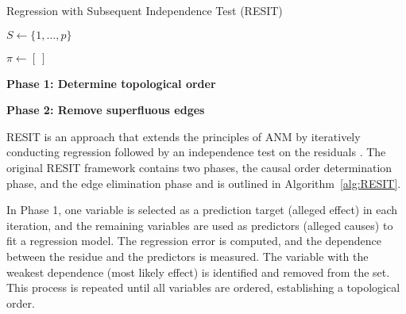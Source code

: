 \begin{algorithm}[htb]
    \caption{Regression with Subsequent Independence Test (RESIT)}
    \label{alg:RESIT}
      \SetAlgoLined

    $S \gets \{1, \ldots, p\}$

    $\pi \gets [\ ]$
    
    \textbf{Phase 1: Determine topological order}
    

    \textbf{Phase 2: Remove superfluous edges}
    
\end{algorithm}


RESIT is an approach that extends the principles of ANM by iteratively conducting regression followed by an independence test on the residuals \citep{peters2014causal}. The original RESIT framework contains two phases, the causal order determination phase, and the edge elimination phase and is outlined in Algorithm~\ref{alg:RESIT}.

In Phase 1, one variable is selected as a prediction target (alleged effect) in each iteration, and the remaining variables are used as predictors (alleged causes) to fit a regression model. The regression error is computed, and the dependence between the residue and the predictors is measured. The variable with the weakest dependence (most likely effect) is identified and removed from the set. This process is repeated until all variables are ordered, establishing a topological order.

